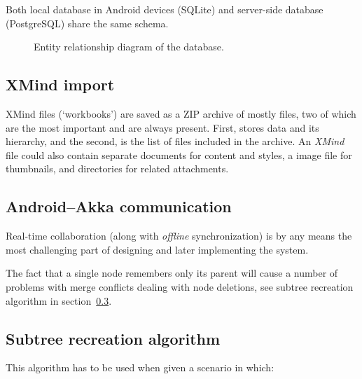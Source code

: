 Both local database in Android devices (SQLite) and server-side database (PostgreSQL) share the same schema.

\begin{figure}[h]
	\centering
	\caption{Entity relationship diagram of the database.}
	\label{fig:erd}
\end{figure}

\subsection{XMind import}
\label{subsec:xmind-exchange}

XMind files (`workbooks') are saved as a ZIP archive of mostly  files, two of which are the most important and are always present. First,  stores data and its hierarchy, and the second,  is the list of files included in the archive. An {\em XMind} file could also contain separate  documents for content and styles, a  image file for thumbnails, and directories for related attachments. \cite{XMind:2009:Format}


\subsection{Android--Akka communication}
\label{subsec:android-akka-comm}

Real-time collaboration (along with \emph{offline} synchronization) is by any means the most challenging part of designing and later implementing the system.


The fact that a single node remembers only its parent will cause a number of problems with merge conflicts dealing with node deletions, see subtree recreation algorithm in section~\ref{subsec:subtree-recreation}.

\subsection{Subtree recreation algorithm}
\label{subsec:subtree-recreation}

This algorithm has to be used when given a scenario in which:

